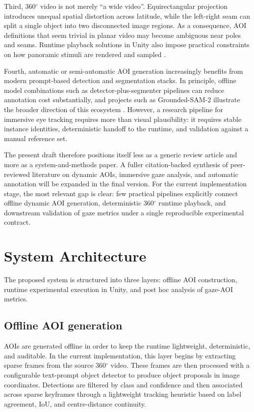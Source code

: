 \documentclass[11pt]{article}
\begin{document}
Third, 360$^{\circ}$ video is not merely ``a wide video''. Equirectangular projection introduces unequal spatial distortion across latitude, while the left-right seam can split a single object into two disconnected image regions. As a consequence, AOI definitions that seem trivial in planar video may become ambiguous near poles and seams. Runtime playback solutions in Unity also impose practical constraints on how panoramic stimuli are rendered and sampled \cite{unity_panoramic_intro,unity_panoramic_video,unity_panoramic_skybox}.

Fourth, automatic or semi-automatic AOI generation increasingly benefits from modern prompt-based detection and segmentation stacks. In principle, offline model combinations such as detector-plus-segmenter pipelines can reduce annotation cost substantially, and projects such as Grounded-SAM-2 illustrate the broader direction of this ecosystem \cite{grounded_sam2}. However, a research pipeline for immersive eye tracking requires more than visual plausibility: it requires stable instance identities, deterministic handoff to the runtime, and validation against a manual reference set.

The present draft therefore positions itself less as a generic review article and more as a system-and-methods paper. A fuller citation-backed synthesis of peer-reviewed literature on dynamic AOIs, immersive gaze analysis, and automatic annotation will be expanded in the final version. For the current implementation stage, the most relevant gap is clear: few practical pipelines explicitly connect offline dynamic AOI generation, deterministic 360$^{\circ}$ runtime playback, and downstream validation of gaze metrics under a single reproducible experimental contract.

\section{System Architecture}

The proposed system is structured into three layers: offline AOI construction, runtime experimental execution in Unity, and post hoc analysis of gaze-AOI metrics.

\subsection{Offline AOI generation}
AOIs are generated offline in order to keep the runtime lightweight, deterministic, and auditable. In the current implementation, this layer begins by extracting sparse frames from the source 360$^{\circ}$ video. These frames are then processed with a configurable text-prompt object detector to produce object proposals in image coordinates. Detections are filtered by class and confidence and then associated across sparse keyframes through a lightweight tracking heuristic based on label agreement, IoU, and centre-distance continuity.
\end{document}
